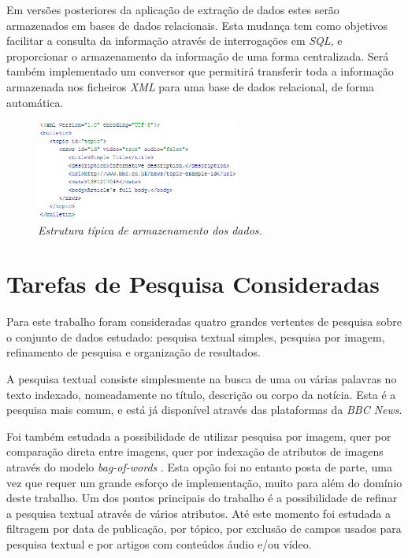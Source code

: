 \documentclass[twocolumn,twoside,10pt,a4paper]{article}
\begin{document}
Em versões posteriores da aplicação de extração de dados estes serão armazenados em bases de dados relacionais. Esta mudança tem como objetivos facilitar a consulta da informação através de interrogações em \textit{SQL}, e proporcionar o armazenamento da informação de uma forma centralizada. Será também implementado um conversor que permitirá transferir toda a informação armazenada nos ficheiros \textit{XML} para uma base de dados relacional, de forma automática.

\begin{figure}[ht]
\centering
\includegraphics[width=0.6\textwidth]{xml.png}
\caption{\it Estrutura típica de armazenamento dos dados.}
\label{fig:xml}
\end{figure}

\section{Tarefas de Pesquisa Consideradas}\label{sec:work}

Para este trabalho foram consideradas quatro grandes vertentes de pesquisa sobre o conjunto de dados estudado: pesquisa textual simples, pesquisa por imagem, refinamento de pesquisa e organização de resultados.

A pesquisa textual consiste simplesmente na busca de uma ou várias palavras no texto indexado, nomeadamente no título, descrição ou corpo da notícia. Esta é a pesquisa mais comum, e está já disponível através das plataformas da \textit{BBC News}.

Foi também estudada a possibilidade de utilizar pesquisa por imagem, quer por comparação direta entre imagens, quer por indexação de atributos de imagens através do modelo \textit{bag-of-words} \cite{wiki:bow}. Esta opção foi no entanto posta de parte, uma vez que requer um grande esforço de implementação, muito para além do domínio deste trabalho.
Um dos pontos principais do trabalho é a possibilidade de refinar a pesquisa textual através de vários atributos. Até este momento foi estudada a filtragem por data de publicação, por tópico, por exclusão de campos usados para pesquisa textual e por artigos com conteúdos áudio e/ou vídeo.
\end{document}
